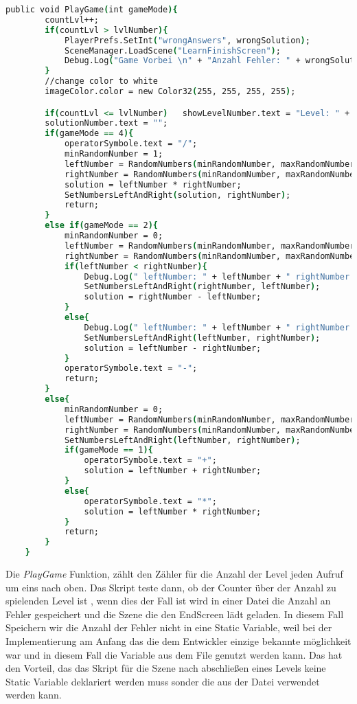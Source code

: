 \begin{lstlisting}[language=csh, caption={MathOperations.cs PlayGame Funktion}]
public void PlayGame(int gameMode){
		countLvl++;
		if(countLvl > lvlNumber){
			PlayerPrefs.SetInt("wrongAnswers", wrongSolution);
			SceneManager.LoadScene("LearnFinishScreen");
			Debug.Log("Game Vorbei \n" + "Anzahl Fehler: " + wrongSolution);
		}
		//change color to white
		imageColor.color = new Color32(255, 255, 255, 255);

		if(countLvl <= lvlNumber)	showLevelNumber.text = "Level: " + countLvl + "/" + lvlNumber;
		solutionNumber.text = "";
		if(gameMode == 4){
			operatorSymbole.text = "/";
			minRandomNumber = 1;
			leftNumber = RandomNumbers(minRandomNumber, maxRandomNumber);
			rightNumber = RandomNumbers(minRandomNumber, maxRandomNumber);
			solution = leftNumber * rightNumber;
			SetNumbersLeftAndRight(solution, rightNumber);
			return;
		}
		else if(gameMode == 2){
			minRandomNumber = 0;
			leftNumber = RandomNumbers(minRandomNumber, maxRandomNumber);
			rightNumber = RandomNumbers(minRandomNumber, maxRandomNumber);
			if(leftNumber < rightNumber){
				Debug.Log(" leftNumber: " + leftNumber + " rightNumber: " + rightNumber + "zweite If");
				SetNumbersLeftAndRight(rightNumber, leftNumber);
				solution = rightNumber - leftNumber;
			}
			else{
				Debug.Log(" leftNumber: " + leftNumber + " rightNumber: " + rightNumber + "zweite If");
				SetNumbersLeftAndRight(leftNumber, rightNumber);
				solution = leftNumber - rightNumber;
			}
			operatorSymbole.text = "-";
			return;
		}
		else{
			minRandomNumber = 0;
			leftNumber = RandomNumbers(minRandomNumber, maxRandomNumber);
			rightNumber = RandomNumbers(minRandomNumber, maxRandomNumber);
			SetNumbersLeftAndRight(leftNumber, rightNumber);
			if(gameMode == 1){
				operatorSymbole.text = "+";
				solution = leftNumber + rightNumber;
			}
			else{
				operatorSymbole.text = "*";
				solution = leftNumber * rightNumber;
			}
			return;
		}
	}
\end{lstlisting}
Die \textit{PlayGame} Funktion, zählt den Zähler für die Anzahl der Level jeden Aufruf um eins nach oben. Das Skript teste dann, ob der Counter über der Anzahl zu spielenden Level ist , wenn dies der Fall ist wird in einer Datei die Anzahl an Fehler gespeichert und die Szene die den EndScreen lädt geladen. In diesem Fall Speichern wir die Anzahl der Fehler nicht in eine Static Variable, weil bei der Implementierung am Anfang das die dem Entwickler einzige bekannte möglichkeit war und in diesem Fall die Variable aus dem File genutzt werden kann. Das hat den Vorteil, das das Skript für die Szene nach abschließen eines Levels keine Static Variable deklariert werden muss sonder die aus der Datei verwendet werden kann.\\
